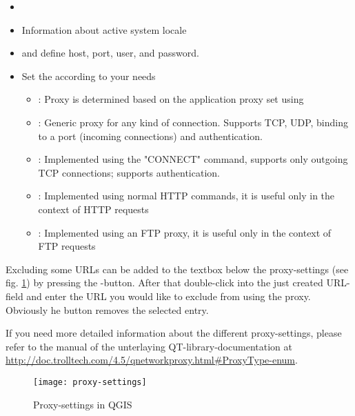
\begin{itemize}
\item {}
\item Information about active system locale
\end{itemize}


\begin{itemize}
\item {} and define host, port, user, and password.
\item Set the  according to your needs
 \begin{itemize}
  \item {}: Proxy is determined based on the application proxy set using
  \item {}: Generic proxy for any kind of connection. Supports TCP, UDP, binding to a port (incoming connections) and authentication.
  \item {}: Implemented using the "CONNECT" command, supports only outgoing TCP connections; supports authentication.
  \item {}: Implemented using normal HTTP commands, it is useful only in the context of HTTP requests
  \item {}: Implemented using an FTP proxy, it is useful only in the context of FTP requests
 \end{itemize}
\end{itemize}

Excluding some URLs can be added to the textbox below the proxy-settings (see
fig. \ref{fig:proxy-settings}) by pressing the -button. After that
double-click into the just created URL-field and enter the URL you would like
to exclude from using the proxy. Obviously he button  removes the selected
entry.

If you need more detailed information about the different proxy-settings,
please refer to the manual of the unterlaying QT-library-documentation at
\url{http://doc.trolltech.com/4.5/qnetworkproxy.html#ProxyType-enum}.

\begin{figure}[ht]
   \begin{center}
   \caption{Proxy-settings in QGIS \nixcaption}
   \texttt{[image: proxy-settings]}
   \label{fig:proxy-settings}
\end{center} 
\end{figure}

